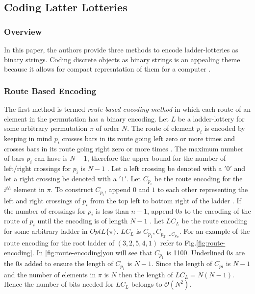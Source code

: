 \subsection{Coding Latter Lotteries}
\subsubsection{Overview}
In this paper, the authors provide three methods to encode ladder-lotteries as 
binary strings. Coding discrete objects as binary strings is an appealing theme because 
it allows for compact represntation of them for a computer \cite{A5}.
\subsubsection{Route Based Encoding}
The first method is termed \emph{route based encoding method} in 
which each route of an element in the permutation has a binary encoding. Let $L$
be a ladder-lottery for some arbitrary permutation $\pi$ of order $N$. The route 
of element $p_{i}$ is encoded by keeping in mind $p_{i}$ crosses bars in its route 
going left zero or more times and crosses bars in its route going right zero or 
more times \cite{A5}. The maximum number of bars $p_{i}$ can have is $N-1$, therefore the 
upper bound for the number of left/right crossings for $p_{i}$ is $N-1$ \cite{A5}. 
Let a left crossing be denoted with a $'0'$ and let a right crossing be denoted 
with a $'1'$. Let $C_{p_{i}}$ be the route encoding for the $i^{th}$ element 
in $\pi$. To construct $C_{p_{i}}$,  append $0$ and $1$ to each other representing 
the left and right crossings of $p_{i}$ from the top left 
to bottom right of the ladder \cite{A5}. If the number of crossings for $p_{i}$ 
is less than $n-1$, append $0s$ to the encoding of the route of $p_{i}$ until
the encoding is of length $N-1$ \cite{A5}. Let $LC_{L}$ be the route encoding for 
some arbitrary ladder in $OptL\{\pi\}$. $LC_{L}$ is $C_{p_{1}}, C_{p_{2}, \dots C_{p_{N}}}$.
For an example of the route encoding for the root ladder of $(3,2,5,4,1)$ refer to 
Fig.\ref{fig:route-encoding}. In \ref{fig:route-encoding}you will see that $C_{p_{1}}$ is 11\underline{00}. Underlined 
$0s$ are the $0s$ added to ensure the length of $C_{p_{1}}$ is $N-1$.
Since the length of $C_{pi}$ is $N-1$ and the number of elements in $\pi$ is $N$
then the length of $LC_{L}=N(N-1)$. Hence the number of bits needed for $LC_{L}$ 
belongs to $\mathcal{O}(N^{2})$.\par 
